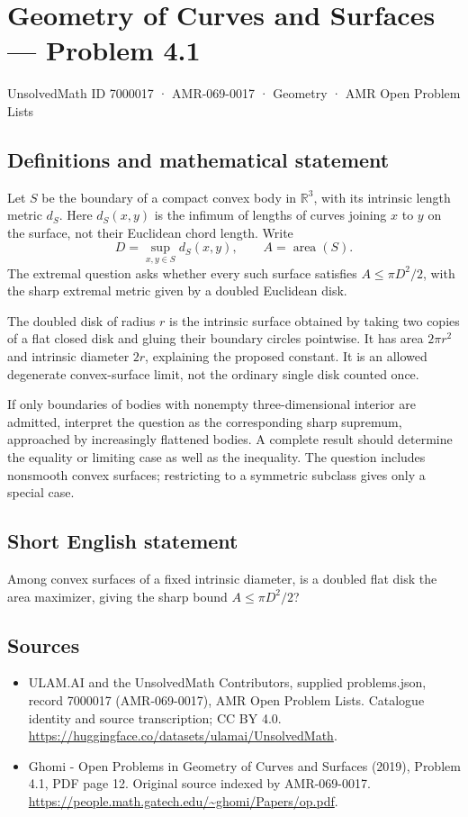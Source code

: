 \documentclass[11pt,a4paper]{article}
\begin{document}
\section*{Geometry of Curves and Surfaces — Problem 4.1}\label{7000017}
{\small UnsolvedMath ID 7000017 · AMR-069-0017 · Geometry · AMR Open Problem Lists}
\subsection{Definitions and mathematical statement}
Let $S$ be the boundary of a compact convex body in $\mathbb R^3$,
with its intrinsic length metric $d_S$. Here $d_S(x,y)$ is the
infimum of lengths of curves joining $x$ to $y$ on the surface,
not their Euclidean chord length. Write
\[
        D=\sup_{x,y\in S}d_S(x,y),\qquad A=\operatorname{area}(S).
\]
The extremal question asks whether every such surface satisfies
$A\le\pi D^2/2$, with the sharp extremal metric given by a
doubled Euclidean disk.

The doubled disk of radius $r$ is the intrinsic surface obtained
by taking two copies of a flat closed disk and gluing their
boundary circles pointwise. It has area $2\pi r^2$ and intrinsic
diameter $2r$, explaining the proposed constant. It is an
allowed degenerate convex-surface limit, not the ordinary
single disk counted once.

If only boundaries of bodies with nonempty three-dimensional
interior are admitted, interpret the question as the corresponding
sharp supremum, approached by increasingly flattened bodies.
A complete result should determine the equality or limiting
case as well as the inequality. The question includes nonsmooth
convex surfaces; restricting to a symmetric subclass gives only
a special case.
\subsection{Short English statement}
Among convex surfaces of a fixed intrinsic diameter, is a doubled
flat disk the area maximizer, giving the sharp bound
$A\le\pi D^2/2$?
\subsection{Sources}
\begin{itemize}
\item[S1] ULAM.AI and the UnsolvedMath Contributors, supplied problems.json, record 7000017 (AMR-069-0017), AMR Open Problem Lists. Catalogue identity and source transcription; CC BY 4.0.
\url{https://huggingface.co/datasets/ulamai/UnsolvedMath}.
\item[S2] Ghomi - Open Problems in Geometry of Curves and Surfaces (2019), Problem 4.1, PDF page 12. Original source indexed by AMR-069-0017.
\url{https://people.math.gatech.edu/~ghomi/Papers/op.pdf}.
\end{itemize}
\end{document}
